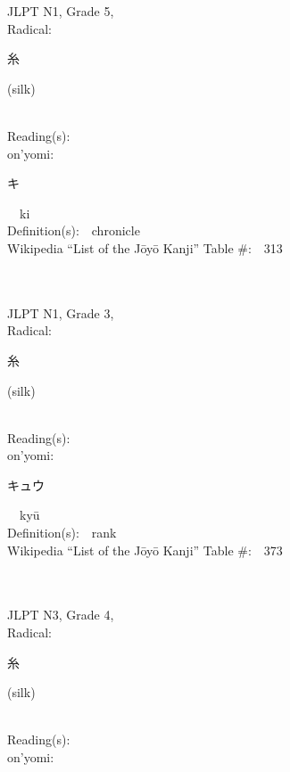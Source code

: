 \begin{multicols}{2}
{JLPT N1, Grade 5, \\Radical:\ \ {\begin{CJK}{UTF8}{min} 糸 \end{CJK}} (silk) } \\
Reading(s):\ \ \\
{\hspace*{1em}}on'yomi:\ \ \\
{\hspace*{2em}}{\begin{CJK}{UTF8}{min} キ \end{CJK}}\ \ ki\ \ \\
Definition(s):\ \ chronicle \\
Wikipedia ``List of the J\=oy\=o Kanji'' Table \#:\ \ 313 \\
\ \ \\
{\fontsize{34pt}{40pt}  }\ \ \\  %
{JLPT N1, Grade 3, \\Radical:\ \ {\begin{CJK}{UTF8}{min} 糸 \end{CJK}} (silk) } \\
Reading(s):\ \ \\
{\hspace*{1em}}on'yomi:\ \ \\
{\hspace*{2em}}{\begin{CJK}{UTF8}{min} キュウ \end{CJK}}\ \ ky\=u\ \ \\
Definition(s):\ \ rank \\
Wikipedia ``List of the J\=oy\=o Kanji'' Table \#:\ \ 373 \\
\ \ \\
{\fontsize{34pt}{40pt}  }\ \ \\  %
{JLPT N3, Grade 4, \\Radical:\ \ {\begin{CJK}{UTF8}{min} 糸 \end{CJK}} (silk) } \\
Reading(s):\ \ \\
{\hspace*{1em}}on'yomi:\ \ \\

\end{multicols}
